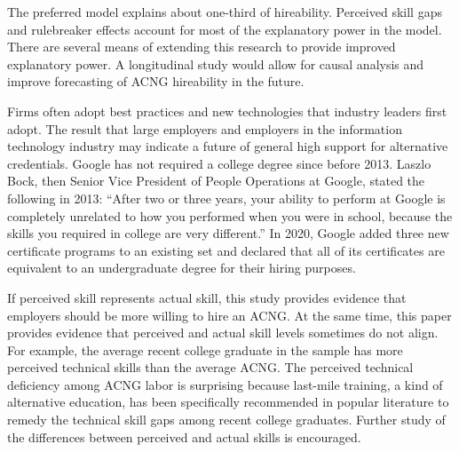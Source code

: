 \documentclass[review]{elsarticle}
\begin{document}
The preferred model explains about one-third of hireability.
Perceived skill gaps and rulebreaker effects account for most of the explanatory power in the model.
There are several means of extending this research to provide improved explanatory power.
A longitudinal study would allow for causal analysis and improve forecasting of ACNG hireability in the future.

Firms often adopt best practices and new technologies that industry leaders first adopt.
The result that large employers and employers in the information technology industry
may indicate a future of general high support for alternative credentials.
Google has not required a college degree since before 2013\cite{bryant2013head}.
Laszlo Bock, then Senior Vice President of People Operations at Google, stated the following in 2013:
``After two or three years, your ability to perform at Google is completely unrelated to how you performed when you were in school, because the skills you required in college are very different.''
In 2020, Google added three new certificate programs to an existing set and declared that all of its certificates are equivalent to an undergraduate degree for their hiring purposes\cite{hess_2020}.

If perceived skill represents actual skill, this study provides evidence that employers should be more willing to hire an ACNG.
At the same time, this paper provides evidence that perceived and actual skill levels sometimes do not align.
For example, the average recent college graduate in the sample has more perceived technical skills than the average ACNG.
The perceived technical deficiency among ACNG labor is surprising because last-mile training, a kind of alternative education, has been specifically recommended in popular literature to remedy the technical skill gaps among recent college graduates.
Further study of the differences between perceived and actual skills is encouraged.
\end{document}

